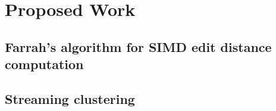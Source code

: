 \section{Proposed Work}

\subsection{Farrah's algorithm for SIMD edit distance computation}

\subsection{Streaming clustering}
